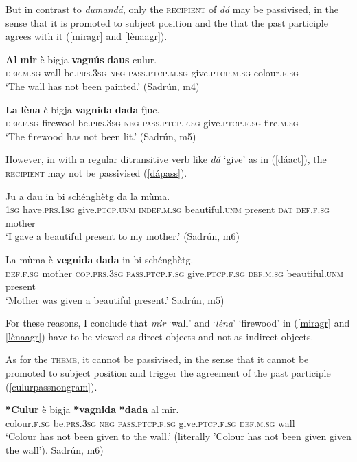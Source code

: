 But in contrast to \textit{dumandá}, only the \textsc{recipient} of \textit{dá} may be passivised, in the sense that it is promoted to subject position and the that the past participle agrees with it (\ref{miragr} and \ref{lènaagr}).

\ea
\label{miragr}
\gll  \textbf{Al} \textbf{mir} è bigja \textbf{vagnús} \textbf{daus} culur.\\
\textsc{def.m.sg} wall be.\textsc{prs.3sg} \textsc{neg} \textsc{pass.ptcp.m.sg} give\textsc{.ptcp.m.sg} colour.\textsc{f.sg}\\
\glt `The wall has not been painted.' (Sadrún, m4)
\z

\ea
\label{lènaagr}
\gll  \textbf{La} \textbf{lèna} è bigja \textbf{vagnida} \textbf{dada} fjuc.\\
\textsc{def.f.sg} firewool be.\textsc{prs.3sg} \textsc{neg} \textsc{pass.ptcp.f.sg} give.\textsc{ptcp.f.sg} fire.\textsc{m.sg}\\
\glt `The firewood has not been lit.' (Sadrún, m5)
\z


However, in with a regular ditransitive verb like \textit{dá} `give' as in (\ref{dáact}), the \textsc{recipient} may not be passivised (\ref{dápass}).

\ea
\label{dáact}
 \gll Ju a dau in bi schénghètg da la mùma.\\
 \textsc{1sg} have\textsc{.prs.1sg} give\textsc{.ptcp.unm} \textsc{indef.m.sg} beautiful.\textsc{unm} present \textsc{dat} \textsc{def.f.sg} mother\\
\glt  `I gave a beautiful present to my mother.' (Sadrún, m6)
 \z

\ea
\label{dápass}
\gll *La mùma è \textbf{vegnida} \textbf{dada} in bi schénghètg.\\
\textsc{def.f.sg} mother \textsc{cop.prs.3sg} \textsc{pass.ptcp.f.sg} give.\textsc{ptcp.f.sg} \textsc{def.m.sg} beautiful.\textsc{unm} present\\
\glt `Mother was given a beautiful present.' Sadrún, m5)
\z

For these reasons, I conclude that \textit{mir} `wall' and `\textit{lèna}' `firewood' in (\ref{miragr} and \ref{lènaagr}) have to be viewed as direct objects and not as indirect objects.


As for the \textsc{theme}, it cannot be passivised, in the sense that it cannot be promoted to subject position and trigger the agreement of the past participle (\ref{culurpassnongram}).

\ea
\label{culurpassnongram}
\gll  \textbf{*Culur} è   bigja \textbf{*vagnida} \textbf{*dada} al mir.\\
colour.\textsc{f.sg} be.\textsc{prs.3sg} \textsc{neg} \textsc{pass.ptcp.f.sg} give.\textsc{ptcp.f.sg}  \textsc{def.m.sg} wall\\
\glt `Colour has not been given to the wall.' (literally 'Colour has not been given given the wall'). Sadrún, m6)
\z



